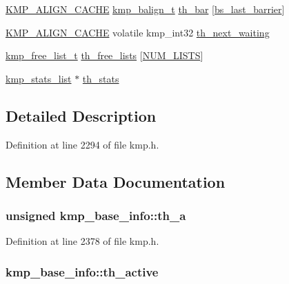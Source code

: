 \begin{DoxyCompactItemize}
\hyperlink{kmp__os_8h_a6830c178a3906c25cd0138d8365db070}{K\-M\-P\-\_\-\-A\-L\-I\-G\-N\-\_\-\-C\-A\-C\-H\-E} \hyperlink{kmp_8h_aa445bb0d4c289a169bc633a9c9d18140}{kmp\-\_\-balign\-\_\-t} \hyperlink{structkmp__base__info_a11a3e7eb49becf1e6c63dbbf04b0d08e}{th\-\_\-bar} \mbox{[}\hyperlink{kmp_8h_ad0f7c21f2f1d446087ef5714eb0fd8cfaab77402926ed27b4683d9f72f0c369ed}{bs\-\_\-last\-\_\-barrier}\mbox{]}
\item 
\hyperlink{kmp__os_8h_a6830c178a3906c25cd0138d8365db070}{K\-M\-P\-\_\-\-A\-L\-I\-G\-N\-\_\-\-C\-A\-C\-H\-E} volatile kmp\-\_\-int32 \hyperlink{structkmp__base__info_a4fdcd4b88bd79f9d8eaacd8d176a6e3d}{th\-\_\-next\-\_\-waiting}
\item 
\hyperlink{kmp_8h_a6d2ab21f0851df312a9b737d5186d853}{kmp\-\_\-free\-\_\-list\-\_\-t} \hyperlink{structkmp__base__info_aa88271560ab80247998b1ef3dc605a64}{th\-\_\-free\-\_\-lists} \mbox{[}\hyperlink{kmp_8h_aa3c9e19ca57d52bdde58c0e26205d02d}{N\-U\-M\-\_\-\-L\-I\-S\-T\-S}\mbox{]}
\item 
\hyperlink{classkmp__stats__list}{kmp\-\_\-stats\-\_\-list} $\ast$ \hyperlink{structkmp__base__info_af78ae2b3f2ff710fe09732ed25d0e7f1}{th\-\_\-stats}
\end{DoxyCompactItemize}


\subsection{Detailed Description}


Definition at line 2294 of file kmp.\-h.



\subsection{Member Data Documentation}
\hypertarget{structkmp__base__info_aa7681a0885f659ef85fa65bfe68352e6}{
\subsubsection[{th\-\_\-a}]{\setlength{\rightskip}{0pt plus 5cm}unsigned kmp\-\_\-base\-\_\-info\-::th\-\_\-a}}\label{structkmp__base__info_aa7681a0885f659ef85fa65bfe68352e6}


Definition at line 2378 of file kmp.\-h.

\hypertarget{structkmp__base__info_af7578fa494e619f5fc8bab453f6e6e16}{
\subsubsection[{th\-\_\-active}]{ kmp\-\_\-base\-\_\-info\-::th\-\_\-active}}\label{structkmp__base__info_af7578fa494e619f5fc8bab453f6e6e16}


